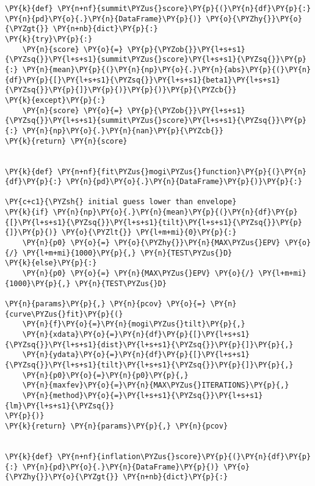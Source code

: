 \begin{tcolorbox}[breakable, size=fbox, boxrule=1pt, pad at break*=1mm,colback=cellbackground, colframe=cellborder]
\begin{Verbatim}[commandchars=\\\{\}]
\PY{k}{def} \PY{n+nf}{summit\PYZus{}score}\PY{p}{(}\PY{n}{df}\PY{p}{:} \PY{n}{pd}\PY{o}{.}\PY{n}{DataFrame}\PY{p}{)} \PY{o}{\PYZhy{}}\PY{o}{\PYZgt{}} \PY{n+nb}{dict}\PY{p}{:}
\PY{k}{try}\PY{p}{:}
    \PY{n}{score} \PY{o}{=} \PY{p}{\PYZob{}}\PY{l+s+s1}{\PYZsq{}}\PY{l+s+s1}{summit\PYZus{}score}\PY{l+s+s1}{\PYZsq{}}\PY{p}{:} \PY{n}{mean}\PY{p}{(}\PY{n}{np}\PY{o}{.}\PY{n}{abs}\PY{p}{(}\PY{n}{df}\PY{p}{[}\PY{l+s+s1}{\PYZsq{}}\PY{l+s+s1}{beta1}\PY{l+s+s1}{\PYZsq{}}\PY{p}{]}\PY{p}{)}\PY{p}{)}\PY{p}{\PYZcb{}}
\PY{k}{except}\PY{p}{:}
    \PY{n}{score} \PY{o}{=} \PY{p}{\PYZob{}}\PY{l+s+s1}{\PYZsq{}}\PY{l+s+s1}{summit\PYZus{}score}\PY{l+s+s1}{\PYZsq{}}\PY{p}{:} \PY{n}{np}\PY{o}{.}\PY{n}{nan}\PY{p}{\PYZcb{}}
\PY{k}{return} \PY{n}{score}


\PY{k}{def} \PY{n+nf}{fit\PYZus{}mogi\PYZus{}function}\PY{p}{(}\PY{n}{df}\PY{p}{:} \PY{n}{pd}\PY{o}{.}\PY{n}{DataFrame}\PY{p}{)}\PY{p}{:}

\PY{c+c1}{\PYZsh{} initial guess lower than envelope}
\PY{k}{if} \PY{n}{np}\PY{o}{.}\PY{n}{mean}\PY{p}{(}\PY{n}{df}\PY{p}{[}\PY{l+s+s1}{\PYZsq{}}\PY{l+s+s1}{tilt}\PY{l+s+s1}{\PYZsq{}}\PY{p}{]}\PY{p}{)} \PY{o}{\PYZlt{}} \PY{l+m+mi}{0}\PY{p}{:}
    \PY{n}{p0} \PY{o}{=} \PY{o}{\PYZhy{}}\PY{n}{MAX\PYZus{}EPV} \PY{o}{/} \PY{l+m+mi}{1000}\PY{p}{,} \PY{n}{TEST\PYZus{}D}
\PY{k}{else}\PY{p}{:}
    \PY{n}{p0} \PY{o}{=} \PY{n}{MAX\PYZus{}EPV} \PY{o}{/} \PY{l+m+mi}{1000}\PY{p}{,} \PY{n}{TEST\PYZus{}D}

\PY{n}{params}\PY{p}{,} \PY{n}{pcov} \PY{o}{=} \PY{n}{curve\PYZus{}fit}\PY{p}{(}
    \PY{n}{f}\PY{o}{=}\PY{n}{mogi\PYZus{}tilt}\PY{p}{,}
    \PY{n}{xdata}\PY{o}{=}\PY{n}{df}\PY{p}{[}\PY{l+s+s1}{\PYZsq{}}\PY{l+s+s1}{dist}\PY{l+s+s1}{\PYZsq{}}\PY{p}{]}\PY{p}{,}
    \PY{n}{ydata}\PY{o}{=}\PY{n}{df}\PY{p}{[}\PY{l+s+s1}{\PYZsq{}}\PY{l+s+s1}{tilt}\PY{l+s+s1}{\PYZsq{}}\PY{p}{]}\PY{p}{,}
    \PY{n}{p0}\PY{o}{=}\PY{n}{p0}\PY{p}{,}
    \PY{n}{maxfev}\PY{o}{=}\PY{n}{MAX\PYZus{}ITERATIONS}\PY{p}{,}
    \PY{n}{method}\PY{o}{=}\PY{l+s+s1}{\PYZsq{}}\PY{l+s+s1}{lm}\PY{l+s+s1}{\PYZsq{}}
\PY{p}{)}
\PY{k}{return} \PY{n}{params}\PY{p}{,} \PY{n}{pcov}


\PY{k}{def} \PY{n+nf}{inflation\PYZus{}score}\PY{p}{(}\PY{n}{df}\PY{p}{:} \PY{n}{pd}\PY{o}{.}\PY{n}{DataFrame}\PY{p}{)} \PY{o}{\PYZhy{}}\PY{o}{\PYZgt{}} \PY{n+nb}{dict}\PY{p}{:}


\end{Verbatim}
\end{tcolorbox}
